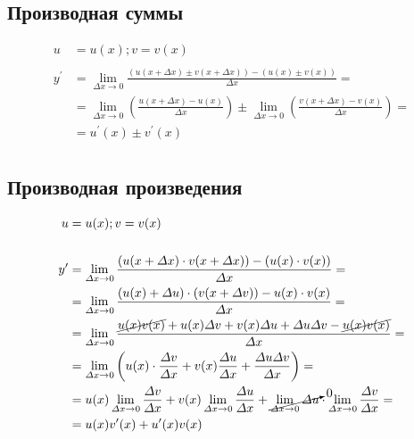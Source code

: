 \documentclass[12pt, fleqn]{article}
\begin{document}
\subsection{Производная суммы}
\begin{align*}
	u&=u(x); v = v(x)\\\\
	y^\prime &= \lim_{\varDelta x \to 0}\frac{\left(u(x+\varDelta x)\pm v(x+\varDelta x)\right) - \left(u(x)\pm v(x)\right)}{\varDelta x}=\\
	&=\lim_{\varDelta x \to 0}\left(\frac{u(x+\varDelta x) - u(x)}{\varDelta x}\right)\pm \lim_{\varDelta x \to 0}\left(\frac{v(x+\varDelta x) - v(x)}{\varDelta x}\right)=\\
	&= u^\prime(x)\pm v^\prime(x)\\
\end{align*}
\subsection{Производная произведения}
\begin{align*}
	u&=u(x); v = v(x)\\\\
	y^\prime &= \lim_{\varDelta x \to 0}\frac{\left(u(x+\varDelta x)\cdot v(x+\varDelta x)\right) - \left(u(x)\cdot v(x)\right)}{\varDelta x}=\\
	&=\lim_{\varDelta x \to 0}\frac{\left(u(x)+\varDelta u\right) \cdot \left(v(x + \varDelta v)\right) - u(x)\cdot v(x)}{\varDelta x}=\\
	&=\lim_{\varDelta x \to 0}\frac{\cancel{u(x)v(x)}+u(x)\varDelta v+ v(x)\varDelta u +\varDelta u \varDelta v -\cancel{u(x) v(x)}}{\varDelta x}=\\
	&=\lim_{\varDelta x \to 0}\left(u(x)\cdot\frac{\varDelta v}{\varDelta x}+ v(x)\frac{\varDelta u}{\varDelta x} +\frac{\varDelta u \varDelta v}{\varDelta x}\right)=\\
	&=u(x)\lim_{\varDelta x \to 0}\frac{\varDelta v}{\varDelta x}+v(x)\lim_{\varDelta x \to 0}\frac{\varDelta u}{\varDelta x}+\cancelto{0}{\lim_{\varDelta x \to 0}\varDelta u}\cdot \lim_{\varDelta x \to 0}\frac{\varDelta v}{\varDelta x}=\\
	&=u(x)v^\prime(x)+u^\prime(x)v(x)
\end{align*}
\end{document}
